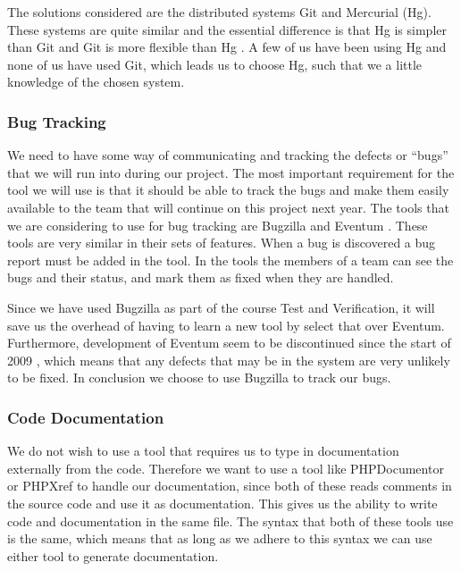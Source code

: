 The solutions considered are the distributed systems Git and Mercurial (Hg).
These systems are quite similar and the essential difference is that Hg is simpler than Git and Git is more flexible than Hg \cite{gitVsHg}.
A few of us have been using Hg and none of us have used Git, which leads us to choose Hg, such that we a little knowledge of the chosen system.

\subsubsection{Bug Tracking}
We need to have some way of communicating and tracking the defects or ``bugs'' that we will run into during our project.
The most important requirement for the tool we will use is that it should be able to track the bugs and make them easily available to the team that will continue on this project next year.
The tools that we are considering to use for bug tracking are Bugzilla \cite{bugzillaFeat} and Eventum \cite{eventumFeat}.
These tools are very similar in their sets of features.
When a bug is discovered a bug report must be added in the tool.
In the tools the members of a team can see the bugs and their status, and mark them as fixed when they are handled.

Since we have used Bugzilla as part of the course Test and Verification, it will save us the overhead of having to learn a new tool by select that over Eventum.
Furthermore, development of Eventum seem to be discontinued since the start of 2009 \cite{eventumDiscont}, which means that any defects that may be in the system are very unlikely to be fixed.
In conclusion we choose to use Bugzilla to track our bugs.

\subsubsection{Code Documentation}
We do not wish to use a tool that requires us to type in documentation externally from the code.
Therefore we want to use a tool like PHPDocumentor \cite{phpdocumentor} or PHPXref \cite{phpxref} to handle our documentation, since both of these reads comments in the source code and use it as documentation.
This gives us the ability to write code and documentation in the same file.
The syntax that both of these tools use is the same, which means that as long as we adhere to this syntax we can use either tool to generate documentation.

